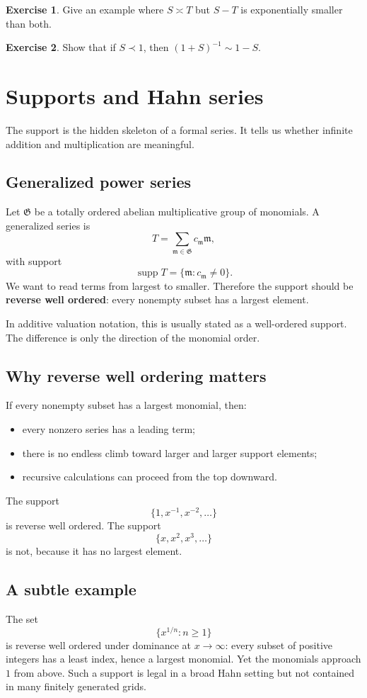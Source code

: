 \documentclass[11pt,oneside,openany]{book}
\newcommand{\G}{\mathfrak{G}}
\newcommand{\supp}{\operatorname{supp}}
\newcommand{\mon}{\mathfrak{m}}
\theoremstyle{plain}
\theoremstyle{definition}
\newtheorem{exercise}{Exercise}[chapter]
\theoremstyle{remark}
\newcommand{\term}[1]{\textbf{#1}}
\begin{document}
\begin{exercise}
Give an example where $S\asymp T$ but $S-T$ is exponentially smaller than both.
\end{exercise}

\begin{exercise}
Show that if $S\prec1$, then $(1+S)^{-1}\sim1-S$.
\end{exercise}


\chapter{Supports and Hahn series}
\label{ch:hahn}

The support is the hidden skeleton of a formal series. It tells us whether infinite addition and multiplication are meaningful.

\section{Generalized power series}
Let $\G$ be a totally ordered abelian multiplicative group of monomials. A generalized series is
\[
  T=\sum_{\mon\in\G}c_\mon\mon,
\]
with support
\[
  \supp T=\{\mon:c_\mon\ne0\}.
\]
We want to read terms from largest to smaller. Therefore the support should be \term{reverse well ordered}: every nonempty subset has a largest element.

In additive valuation notation, this is usually stated as a well-ordered support. The difference is only the direction of the monomial order.

\section{Why reverse well ordering matters}
If every nonempty subset has a largest monomial, then:
\begin{itemize}
  \item every nonzero series has a leading term;
  \item there is no endless climb toward larger and larger support elements;
  \item recursive calculations can proceed from the top downward.
\end{itemize}

The support
\[
  \{1,x^{-1},x^{-2},\ldots\}
\]
is reverse well ordered. The support
\[
  \{x,x^2,x^3,\ldots\}
\]
is not, because it has no largest element.

\section{A subtle example}
The set
\[
  \{x^{1/n}:n\ge1\}
\]
is reverse well ordered under dominance at $x\to\infty$: every subset of positive integers has a least index, hence a largest monomial. Yet the monomials approach $1$ from above. Such a support is legal in a broad Hahn setting but not contained in many finitely generated grids.
\end{document}
